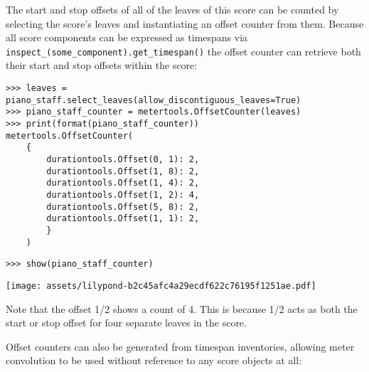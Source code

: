\noindent The start and stop offsets of all of the leaves of this score can be
counted by selecting the score's leaves and instantiating an offset counter
from them. Because all score components can be expressed as timespans via
\texttt{inspect\_(some\_component).get\_timespan()} the offset counter can
retrieve both their start and stop offsets within the score:

\begin{comment}
<abjad>
leaves = piano_staff.select_leaves(allow_discontiguous_leaves=True)
piano_staff_counter = metertools.OffsetCounter(leaves)
print(format(piano_staff_counter))
show(piano_staff_counter)
</abjad>
\end{comment}

\begin{abjadbookoutput}
\begin{singlespacing}
\vspace{-0.5\baselineskip}
\begin{verbatim}
>>> leaves = piano_staff.select_leaves(allow_discontiguous_leaves=True)
>>> piano_staff_counter = metertools.OffsetCounter(leaves)
>>> print(format(piano_staff_counter))
metertools.OffsetCounter(
    {
        durationtools.Offset(0, 1): 2,
        durationtools.Offset(1, 8): 2,
        durationtools.Offset(1, 4): 2,
        durationtools.Offset(1, 2): 4,
        durationtools.Offset(5, 8): 2,
        durationtools.Offset(1, 1): 2,
        }
    )
\end{verbatim}
\begin{verbatim}
>>> show(piano_staff_counter)
\end{verbatim}
\noindent\texttt{[image: assets/lilypond-b2c45afc4a29ecdf622c76195f1251ae.pdf]}
\end{singlespacing}
\end{abjadbookoutput}

\noindent Note that the offset 1/2 shows a count of 4. This is because 1/2 acts
as both the start or stop offset for four separate leaves in the score.

Offset counters can also be generated from timespan inventories, allowing meter
convolution to be used without reference to any score objects at all:

\begin{comment}
<abjad>
timespans = timespantools.TimespanInventory([
    timespantools.Timespan(-1, 10),
    timespantools.Timespan(5, 15),
    timespantools.Timespan(15, 20),
    timespantools.Timespan(10, 15),
    ])
timespan_counter = metertools.OffsetCounter(timespans)
show(timespan_counter)
</abjad>
\end{comment}

